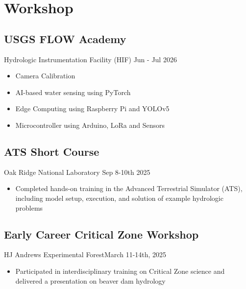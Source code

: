 \section{Workshop}
\subsection{USGS FLOW Academy}{Hydrologic Instrumentation Facility (HIF)} {Jun - Jul 2026} 
\begin{itemize}
    \item Camera Calibration
    \item AI-based water sensing using PyTorch
    \item Edge Computing using Raspberry Pi and YOLOv5
    \item Microcontroller using Arduino, LoRa and Sensors
\end{itemize}

\subsection{ATS Short Course}{Oak Ridge National Laboratory} {Sep 8-10th 2025} 
\begin{itemize}
    \item Completed hands-on training in the Advanced Terrestrial Simulator (ATS), including model setup, execution, and solution of example hydrologic problems
\end{itemize}

\subsection{Early Career Critical Zone Workshop}{HJ Andrews Experimental Forest}{March 11-14th, 2025}
\begin{itemize}
    \item Participated in interdisciplinary training on Critical Zone science and delivered a presentation on beaver dam hydrology 
\end{itemize}

